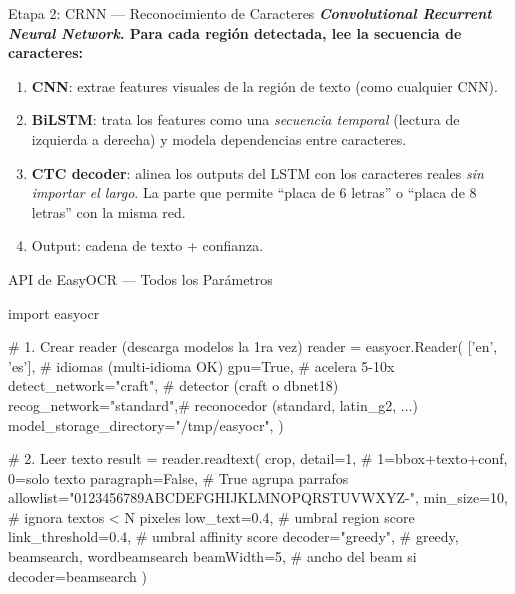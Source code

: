 \begin{frame}[shrink]{Etapa 2: CRNN --- Reconocimiento de Caracteres}
  \vspace{6pt}
  {\footnotesize\color{arcaDark}\bfseries
    \emph{Convolutional Recurrent Neural Network}. Para cada regi\'on
    detectada, lee la secuencia de caracteres:}

  \vspace{12pt}
  {\footnotesize
  \begin{enumerate}\setlength{\itemsep}{6pt}
    \item[{\color{arcaRed}\bfseries 1.}]
      \textbf{CNN}: extrae features visuales de la regi\'on de texto
      (como cualquier CNN).
    \item[{\color{arcaRed}\bfseries 2.}]
      \textbf{BiLSTM}: trata los features como una \emph{secuencia
      temporal} (lectura de izquierda a derecha) y modela
      dependencias entre caracteres.
    \item[{\color{arcaRed}\bfseries 3.}]
      \textbf{CTC decoder}: alinea los outputs del LSTM con los
      caracteres reales \emph{sin importar el largo}. La parte que
      permite ``placa de 6 letras'' o ``placa de 8 letras'' con la
      misma red.
    \item[{\color{codeGreen}\bfseries 4.}]
      Output: cadena de texto + confianza.
  \end{enumerate}
  }
\end{frame}

\begin{frame}{API de EasyOCR --- Todos los Par\'ametros}
  \vspace{-4pt}
  \begin{pyblock}
import easyocr

# 1. Crear reader (descarga modelos la 1ra vez)
reader = easyocr.Reader(
    ['en', 'es'],            # idiomas (multi-idioma OK)
    gpu=True,                # acelera 5-10x
    detect_network="craft",  # detector (craft o dbnet18)
    recog_network="standard",# reconocedor (standard, latin_g2, ...)
    model_storage_directory="/tmp/easyocr",
)

# 2. Leer texto
result = reader.readtext(
    crop,
    detail=1,           # 1=bbox+texto+conf, 0=solo texto
    paragraph=False,    # True agrupa parrafos
    allowlist="0123456789ABCDEFGHIJKLMNOPQRSTUVWXYZ-",
    min_size=10,        # ignora textos < N pixeles
    low_text=0.4,       # umbral region score
    link_threshold=0.4, # umbral affinity score
    decoder="greedy",   # greedy, beamsearch, wordbeamsearch
    beamWidth=5,        # ancho del beam si decoder=beamsearch
)
  \end{pyblock}
\end{frame}

